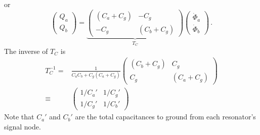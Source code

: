 \documentclass{article}
\begin{document}
or
\begin{equation*}
  \left( \begin{array}{c} Q_a \\ Q_b \end{array} \right)
  =
  \underbrace{
    \left( \begin{array}{cc}
       (C_a + C_g) & -C_g \\
       -C_g & (C_b + C_g) \end{array} \right)
  }_{T_C}
  \left( \begin{array}{c} \dot \Phi_a \\ \dot \Phi_b \end{array} \right)
  \, .
\end{equation*}
The inverse of $T_C$ is
\begin{align*}
  T_C^{-1} =& \frac{1}{C_a C_b + C_g (C_a + C_g)}
  \left( \begin{array}{cc}
    (C_b + C_g) & C_g \\
    C_g & (C_a + C_g)
  \end{array} \right) \\
  \equiv& \left( \begin{array}{cc}
    1 / C_a' & 1 / C_g' \\
    1 / C_g' & 1 / C_b'
  \end{array} \right)
\end{align*}
Note that $C_a'$ and $C_b'$ are the total capacitances to ground from each resonator's signal node.
\end{document}
